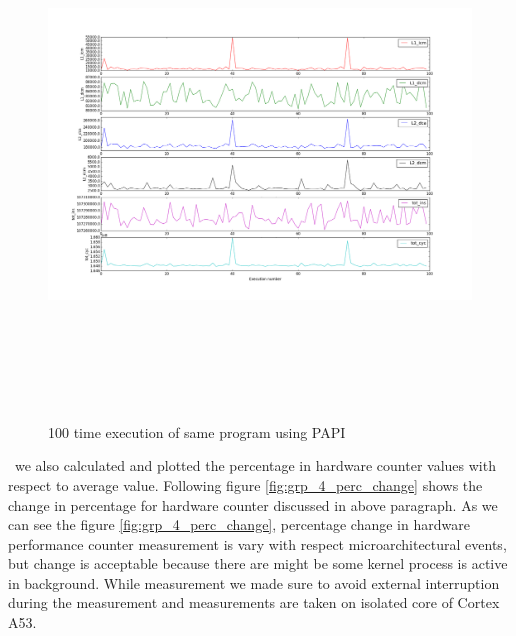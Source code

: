 \begin{figure}[h!]
\includegraphics[width=14cm, height=14cm]{./images/grp_4}
\centering
\caption{100 time execution of same program using PAPI}
\label{fig:grp_4}
\end{figure}

\ we also calculated and plotted the percentage in hardware counter values with respect to average value. Following figure \ref{fig:grp_4_perc_change} shows the change in percentage for hardware counter discussed in above paragraph. As we can see the figure \ref{fig:grp_4_perc_change}, percentage change in hardware performance counter measurement is vary with respect microarchitectural events, but change is acceptable because there are might be some kernel process is active in background. While measurement we made sure to avoid external interruption during the measurement and measurements are taken on isolated core of Cortex A53.  


